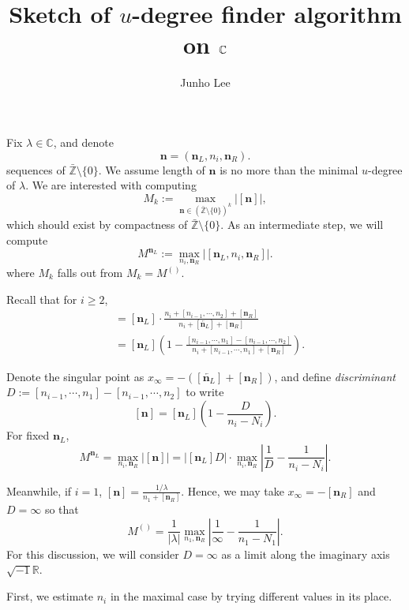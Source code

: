 \documentclass{article}
\title{Sketch of $u$-degree finder algorithm on $\bC$}
\author{Junho Lee}
\theoremstyle{definition}
\theoremstyle{plain}
\theoremstyle{remark}
\numberwithin{equation}{section}
\newcommand{\bZ}{\mathbb{Z}}
\newcommand{\bR}{\mathbb{R}}
\newcommand{\bC}{\mathbb{C}}
\newcommand{\abs}[1]{\left| {#1} \right|}
\newcommand{\im}{{\sqrt{-1}}}
\def\ns{{\mathbf{n}}}
\def\nsL{{\mathbf{n}_L}}
\def\nsR{{\mathbf{n}_R}}
\begin{document}
\maketitle

Fix $\lambda \in \bC$, and denote
\[
  \ns = (\nsL, n_i, \nsR).
\]
sequences of $\bar{\bZ} \setminus \{0\}$.
We assume length of $\ns$ is no more than the minimal $u$-degree of $\lambda$.
We are interested with computing
\[
  M_k := \max_{\ns \in (\bar{\bZ} \setminus \{0\})^k} \abs{[\ns]},
\]
which should exist by compactness of $\bar{\bZ} \setminus \{0\}$.
As an intermediate step, we will compute
\[ M^{\nsL} := \max_{n_i, \nsR} \abs{[\nsL, n_i, \nsR]}. \]
where $M_k$ falls out from $M_k = M^{()}$.

Recall that for $i \geq 2$,
\begin{align*}
  [\ns] & = [\nsL] \cdot \frac{n_i + [n_{i-1}, \cdots, n_2] + [\nsR]}{n_i + [\overleftarrow{\nsL}] + [\nsR]} \\
  & = [\nsL] \left( 1 - \frac{[n_{i-1}, \cdots, n_1] - [n_{i-1}, \cdots, n_2]}{n_i + [n_{i-1}, \cdots, n_1] + [\nsR]} \right).
\end{align*}

Denote the singular point as $x_\infty = - ([\overleftarrow{\nsL}] + [\nsR])$,
and define \textit{discriminant} $D := [n_{i-1}, \cdots, n_1] - [n_{i-1}, \cdots, n_2]$ to write
\[
  [\ns] = [\nsL] \left( 1 - \frac{D}{n_i - N_i} \right).
\]
For fixed $\nsL$,
\[
  M^{\nsL} = \max_{n_i, \nsR} \abs{[\ns]} = \abs{[\nsL] D} \cdot \max_{n_i, \nsR} \left| \frac{1}{D} - \frac{1}{n_i - N_i} \right|.
\]

Meanwhile, if $i = 1$, $[\ns] = \frac{1 / \lambda}{n_1 + [\nsR]}$.
Hence, we may take $x_{\infty} = - [\nsR]$ and $D = \infty$ so that
\[
  M^{()} = \frac{1}{\abs{\lambda}} \max_{n_1, \nsR} \abs{\frac{1}{\infty} - \frac{1}{n_1 - N_1}}.
\]
For this discussion, we will consider $D = \infty$ as a limit along the imaginary axis $\im \bR$.

First, we estimate $n_i$ in the maximal case by trying different values in its place.
\end{document}
